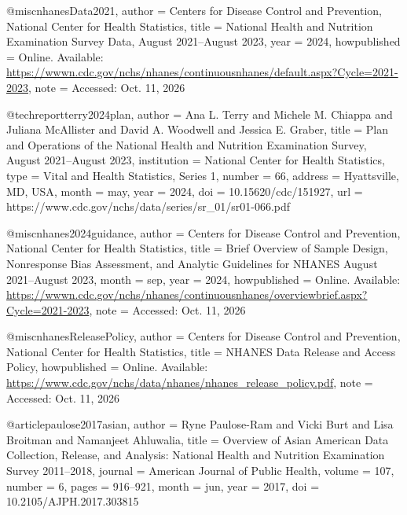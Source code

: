 @misc{nhanesData2021,
  author       = {{Centers for Disease Control and Prevention,
                   National Center for Health Statistics}},
  title        = {{National Health and Nutrition Examination Survey
                   Data, August 2021--August 2023}},
  year         = {2024},
  howpublished = {Online. Available:
                   \url{https://wwwn.cdc.gov/nchs/nhanes/continuousnhanes/default.aspx?Cycle=2021-2023}},
  note         = {Accessed: Oct. 11, 2026}
}

@techreport{terry2024plan,
  author      = {Ana L. Terry and Michele M. Chiappa and
                 Juliana McAllister and David A. Woodwell and
                 Jessica E. Graber},
  title       = {Plan and Operations of the National Health and
                 Nutrition Examination Survey, August 2021--August 2023},
  institution = {National Center for Health Statistics},
  type        = {Vital and Health Statistics, Series 1},
  number      = {66},
  address     = {Hyattsville, MD, USA},
  month       = may,
  year        = {2024},
  doi         = {10.15620/cdc/151927},
  url         = {https://www.cdc.gov/nchs/data/series/sr_01/sr01-066.pdf}
}

@misc{nhanes2024guidance,
  author       = {{Centers for Disease Control and Prevention,
                   National Center for Health Statistics}},
  title        = {Brief Overview of Sample Design, Nonresponse Bias
                  Assessment, and Analytic Guidelines for {NHANES}
                  August 2021--August 2023},
  month        = sep,
  year         = {2024},
  howpublished = {Online. Available:
                   \url{https://wwwn.cdc.gov/nchs/nhanes/continuousnhanes/overviewbrief.aspx?Cycle=2021-2023}},
  note         = {Accessed: Oct. 11, 2026}
}

@misc{nhanesReleasePolicy,
  author       = {{Centers for Disease Control and Prevention,
                   National Center for Health Statistics}},
  title        = {{NHANES} Data Release and Access Policy},
  howpublished = {Online. Available:
                   \url{https://www.cdc.gov/nchs/data/nhanes/nhanes_release_policy.pdf}},
  note         = {Accessed: Oct. 11, 2026}
}

@article{paulose2017asian,
  author  = {Ryne Paulose-Ram and Vicki Burt and Lisa Broitman and
             Namanjeet Ahluwalia},
  title   = {Overview of Asian American Data Collection, Release,
             and Analysis: National Health and Nutrition Examination
             Survey 2011--2018},
  journal = {American Journal of Public Health},
  volume  = {107},
  number  = {6},
  pages   = {916--921},
  month   = jun,
  year    = {2017},
  doi     = {10.2105/AJPH.2017.303815}
}

